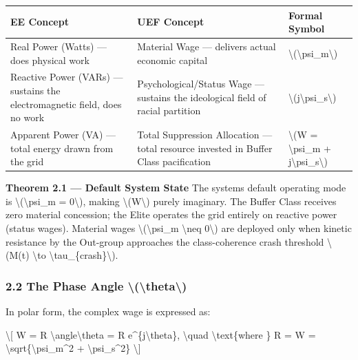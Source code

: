 {\def\LTcaptype{none} %
\begin{longtable}[]{@{}lll@{}}
\toprule\noalign{}
EE Concept & UEF Concept & Formal Symbol \\
\midrule\noalign{}
\endhead
\bottomrule\noalign{}
\endlastfoot
Real Power (Watts) --- does physical work & Material Wage --- delivers
actual economic capital &
\textbackslash(\textbackslash psi\_m\textbackslash) \\
Reactive Power (VARs) --- sustains the electromagnetic field, does no
work & Psychological/Status Wage --- sustains the ideological field of
racial partition &
\textbackslash(j\textbackslash psi\_s\textbackslash) \\
Apparent Power (VA) --- total energy drawn from the grid & Total
Suppression Allocation --- total resource invested in Buffer Class
pacification & \textbackslash(W = \textbackslash psi\_m +
j\textbackslash psi\_s\textbackslash) \\
\end{longtable}
}

\textbf{Theorem 2.1 --- Default System State} The
system\textquotesingle s default operating mode is
\textbackslash(\textbackslash psi\_m = 0\textbackslash), making
\textbackslash(W\textbackslash) purely imaginary. The Buffer Class
receives zero material concession; the Elite operates the grid entirely
on reactive power (status wages). Material wages
\textbackslash(\textbackslash psi\_m \textbackslash neq 0\textbackslash)
are deployed only when kinetic resistance by the Out-group approaches
the class-coherence crash threshold \textbackslash(M(t)
\textbackslash to \textbackslash tau\_\{crash\}\textbackslash).

\subsubsection{2.2 The Phase Angle
\textbackslash(\textbackslash theta\textbackslash)}\label{the-phase-angle-theta}

In polar form, the complex wage is expressed as:

\textbackslash{[} W = R \textbackslash angle\textbackslash theta = R
e\^{}\{j\textbackslash theta\}, \textbackslash quad
\textbackslash text\{where \} R = \textbar W\textbar{} =
\textbackslash sqrt\{\textbackslash psi\_m\^{}2 +
\textbackslash psi\_s\^{}2\} \textbackslash{]}

